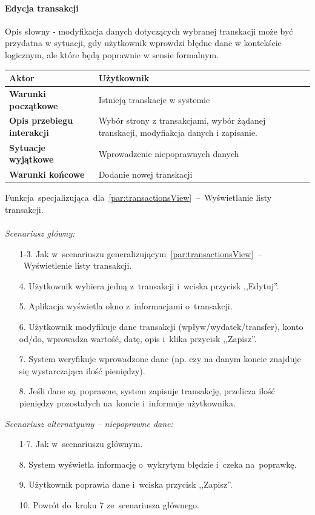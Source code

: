 \paragraph{Edycja transakcji\newline}
\label{par:transactionEdit}
Opis słowny - modyfikacja danych dotyczących wybranej transkacji może być
przydatna w sytuacji, gdy użytkownik wprowdzi błędne dane w kontekście logicznym,
ale które będą poprawnie w sensie formalnym.
\begin{longtable}{|p{5cm}|p{7cm}|}
 	\hline
	\textbf{Aktor} & Użytkownik \\
	\hline
	\textbf{Warunki początkowe} & Istnieją transkacje w systemie
	\\
	\hline
	\textbf{Opis przebiegu interakcji} & Wybór strony z transakcjami, wybór żądanej transkacji,
	modyfiakcja danych i zapisanie.
	\\
	\hline
	\textbf{Sytuacje wyjątkowe} & Wprowadzenie niepoprawnych danych
	\\
	\hline
	\textbf{Warunki końcowe} & Dodanie nowej transkacji
	\\
	\hline
 \end{longtable}
Funkcja~specjalizująca~dla~\ref{par:transactionsView}~--~Wyświetlanie listy transakcji.\\\\
\textit{Scenariusz główny:}
\begin{enumerate}
  \item[1-3.] Jak w~scenariuszu generalizującym~\ref{par:transactionsView}~--~Wyświetlenie listy transakcji.
  \item[4.] Użytkownik wybiera jedną z~transakcji i~wciska przycisk ,,Edytuj''.
  \item[5.] Aplikacja wyświetla okno z~informacjami o~transakcji.
  \item[6.] Użytkownik modyfikuje dane transakcji (wpływ/wydatek/transfer), konto od/do, wprowadza wartość, datę, opis i~klika przycisk ,,Zapisz''.
  \item[7.] System weryfikuje wprowadzone dane (np. czy na danym koncie znajduje się wystarczająca ilość pieniędzy).
  \item[8.] Jeśli dane są~poprawne, system zapisuje transakcję, przelicza ilość pieniędzy pozostałych na~koncie i~informuje użytkownika.
\end{enumerate}
\textit{Scenariusz alternatywny -- niepoprawne dane:}
\begin{enumerate}
  \item[1-7.] Jak w~scenariuszu głównym.
  \item[8.] System wyświetla informację o~wykrytym błędzie i~czeka na~poprawkę.
  \item[9.] Użytkownik poprawia dane i~wciska przycisk ,,Zapisz''.
  \item[10.] Powrót do~kroku 7 ze~scenariusza głównego.
\end{enumerate}


